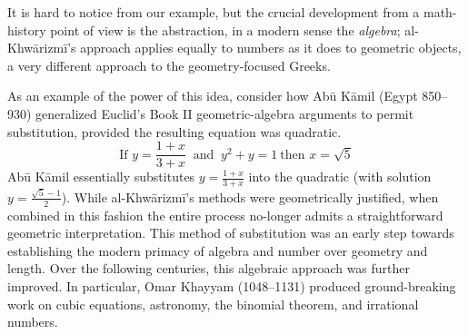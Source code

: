It is hard to notice from our example, but the crucial development from a math-history point of view is the abstraction, in a modern sense the \emph{algebra}; al-Khwārizmī's approach applies equally to numbers as it does to geometric objects, a very different approach to the geometry-focused Greeks.\medbreak

As an example of the power of this idea, consider how Abū Kāmil (Egypt 850--930) generalized Euclid's Book II geometric-algebra arguments to permit substitution, provided the resulting equation was quadratic.
\[
	\text{If }y=\frac{1+x}{3+x}\ \text{ and }\ y^2+y=1\ \text{then }x=\sqrt 5
\]
Abū Kāmil essentially substitutes $y=\frac{1+x}{3+x}$ into the quadratic (with solution $y=\frac{\sqrt 5-1}2$). While al-Khwārizmī's methods were geometrically justified, when combined in this fashion the entire process no-longer admits a straightforward geometric interpretation. This method of substitution was an early step towards establishing the modern primacy of algebra and number over geometry and length.\smallbreak
Over the following centuries, this algebraic approach was further improved. In particular, Omar Khayyam (1048--1131) produced ground-breaking work on cubic equations, astronomy, the binomial theorem, and irrational numbers.


